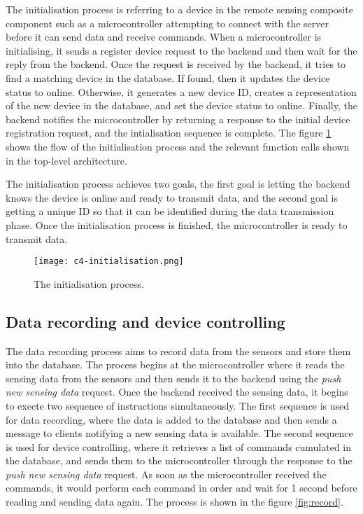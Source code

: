 \documentclass[../thesis.tex]{subfiles}
\begin{document}
The initialisation process is referring to a device in the remote sensing composite component such as a microcontroller attempting to connect with the server before it can send data and receive commands. When a microcontroller is initialising, it sends a register device request to the backend and then wait for the reply from the backend. Once the request is received by the backend, it tries to find a matching device in the database. If found, then it updates the device status to online. Otherwise, it generates a new device ID, creates a representation of the new device in the database, and set the device status to online. Finally, the backend notifies the microcontroller by returning a response to the initial device registration request, and the intialisation sequence is complete. The figure \ref{fig:init} shows the flow of the initialisation process and the relevant function calls shown in the top-level architecture.

The initialisation process achieves two goals, the first goal is letting the backend knows the device is online and ready to transmit data, and the second goal is getting a unique ID so that it can be identified during the data transmission phase. Once the initialisation process is finished, the microcontroller is ready to transmit data. 

\begin{figure}[!ht]
	\centering
	\texttt{[image: c4-initialisation.png]}
	\caption{The initialisation process.}
	\label{fig:init}
\end{figure}

\subsection{Data recording and device controlling}

The data recording process aims to record data from the sensors and store them into the database. The process begins at the microcontroller where it reads the sensing data from the sensors and then sends it to the backend using the \emph{push new sensing data} request. Once the backend received the sensing data, it begins to execte two sequence of instructions simultaneously. The first sequence is used for data recording, where the data is added to the database and then sends a message to clients notifying a new sensing data is available. The second sequence is used for device controlling, where it retrieves a list of commands cumulated in the database, and sends them to the microcontroller through the response to the \emph{push new sensing data} request. As soon as the microcontroller received the commands, it would perform each command in order and wait for 1 second before reading and sending data again. The process is shown in the figure \ref{fig:record}. 
\end{document}
